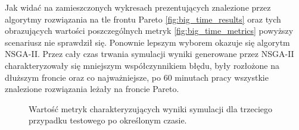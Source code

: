 \documentclass[twoside]{iisthesis}
\begin{document}
Jak widać na zamieszczonych wykresach prezentujących znalezione przez algorytmy rozwiązania na tle frontu Pareto \eqref{fig:big_time_results} oraz tych obrazujących wartości poszczególnych metryk \eqref{fig:big_time_metrics} powyższy scenariusz nie sprawdził się. Ponownie lepszym wyborem okazuje się algorytm NSGA-II. Przez cały czas trwania symulacji wyniki generowane przez NSGA-II charakteryzowały się mniejszym współczynnikiem błędu, były rozłożone na dłuższym froncie oraz co najważniejsze, po 60 minutach pracy wszystkie znalezione rozwiązania leżały na froncie Pareto.
\begin{figure}\centering
{}
    \hfill
{}

    \hfill
{}
\caption{Wartość metryk charakteryzujących wyniki symulacji dla trzeciego przypadku testowego po określonym czasie.}
    \label{fig:big_time_metrics}
\end{figure}
\end{document}
